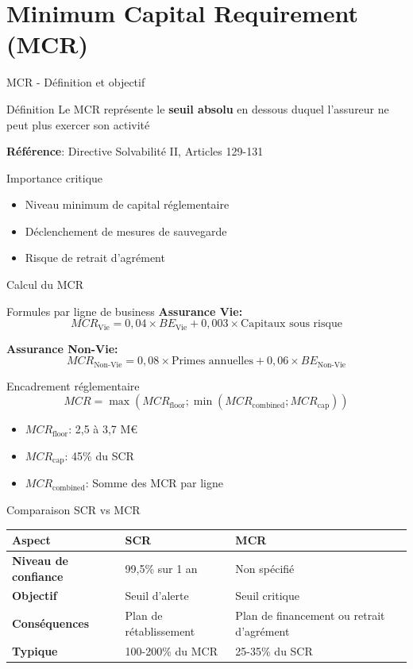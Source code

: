 \documentclass[10pt,aspectratio=169]{beamer}
\begin{document}
\section{Minimum Capital Requirement (MCR)}
\begin{frame}{MCR - Définition et objectif}
\begin{block}{Définition}
Le MCR représente le \textbf{seuil absolu} en dessous duquel l'assureur ne peut plus exercer son activité
\end{block}

\textbf{Référence}: Directive Solvabilité II, Articles 129-131

\begin{alertblock}{Importance critique}
\begin{itemize}
\item Niveau minimum de capital réglementaire
\item Déclenchement de mesures de sauvegarde
\item Risque de retrait d'agrément
\end{itemize}
\end{alertblock}
\end{frame}

\begin{frame}{Calcul du MCR}
\begin{block}{Formules par ligne de business}
\textbf{Assurance Vie:}
\[
MCR_{\text{Vie}} = 0,04 \times BE_{\text{Vie}} + 0,003 \times \text{Capitaux sous risque}
\]

\textbf{Assurance Non-Vie:}
\[
MCR_{\text{Non-Vie}} = 0,08 \times \text{Primes annuelles} + 0,06 \times BE_{\text{Non-Vie}}
\]
\end{block}

\begin{block}{Encadrement réglementaire}
\[
MCR = \max(MCR_{\text{floor}} ; \min(MCR_{\text{combined}} ; MCR_{\text{cap}}))
\]
\begin{itemize}
\item $MCR_{\text{floor}}$: 2,5 à 3,7 M€
\item $MCR_{\text{cap}}$: 45\% du SCR
\item $MCR_{\text{combined}}$: Somme des MCR par ligne
\end{itemize}
\end{block}
\end{frame}

\begin{frame}{Comparaison SCR vs MCR}
\begin{table}
\begin{tabular}{l|p{4cm}|p{4cm}}
\textbf{Aspect} & \textbf{SCR} & \textbf{MCR} \\
\midrule
\textbf{Niveau de confiance} & 99,5\% sur 1 an & Non spécifié \\
\textbf{Objectif} & Seuil d'alerte & Seuil critique \\
\textbf{Conséquences} & Plan de rétablissement & Plan de financement ou retrait d'agrément \\
\textbf{Typique} & 100-200\% du MCR & 25-35\% du SCR \\
\end{tabular}
\end{table}
\end{frame}
\end{document}
